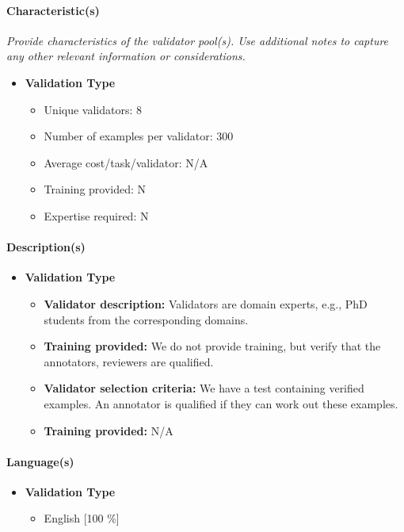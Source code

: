 \paragraph{Characteristic(s)}
\textit{Provide characteristics of the validator pool(s). Use additional notes to capture any other relevant information or considerations.}
\begin{itemize}
    \item \textbf{Validation Type}
    \begin{itemize}
        \item Unique validators: 8
        \item Number of examples per validator: 300
        \item Average cost/task/validator: N/A
        \item Training provided: N
        \item Expertise required: N
    \end{itemize}
\end{itemize}

\paragraph{Description(s)}
\begin{itemize}
    \item \textbf{Validation Type}
    \begin{itemize}
        \item \textbf{Validator description:} Validators are domain experts, e.g., PhD students from the corresponding domains.
        \item \textbf{Training provided:} We do not provide training, but verify that the annotators, reviewers are qualified.
        \item \textbf{Validator selection criteria:} We have a test containing verified examples. An annotator is qualified if they can work out these examples.
        \item \textbf{Training provided:} N/A
    \end{itemize}
\end{itemize}

\paragraph{Language(s)}
\begin{itemize}
    \item \textbf{Validation Type}
    \begin{itemize}
        \item English [100 \%]
    \end{itemize}
\end{itemize}

